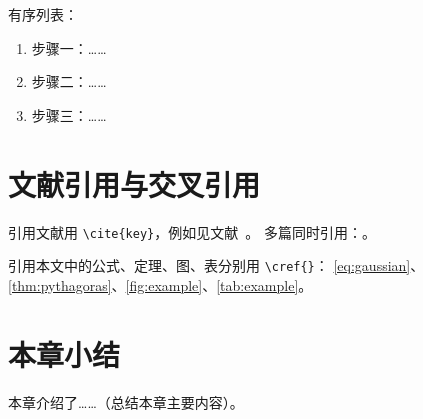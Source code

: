 有序列表：
\begin{enumerate}
  \item 步骤一：……
  \item 步骤二：……
  \item 步骤三：……
\end{enumerate}

\section{文献引用与交叉引用}

引用文献用 \verb|\cite{key}|，例如见文献~\cite{doe2020}。
多篇同时引用：\cite{doe2020,smith2021}。

引用本文中的公式、定理、图、表分别用 \verb|\cref{}|：
\cref{eq:gaussian}、\cref{thm:pythagoras}、\cref{fig:example}、\cref{tab:example}。

\section{本章小结}

本章介绍了……（总结本章主要内容）。
